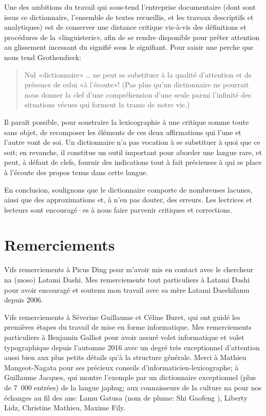Une des ambitions du travail qui sous-tend l'entreprise documentaire (dont sont issus ce dictionnaire, l'ensemble de textes recueillis, et les travaux descriptifs et analytiques) est de conserver une distance critique vis-à-vis des définitions et procédures de la «linguisterie», afin de se rendre disponible pour prêter attention au glissement incessant du signifié sous le signifiant. Pour saisir une perche que nous tend Grothendieck:

\begin{quotation}
    Nul «dictionnaire» {\dots} ne peut se substituer à la qualité d'attention et de présence de celui «à l'écoute»! (Pas plus qu'un dictionnaire ne pourrait nous donner la clef d'une compréhension d'une seule parmi l'infinité des situations vécues qui forment la trame de notre vie.) \cite[1257]{grothendieck_recoltes_2021}
\end{quotation}

Il paraît possible, pour soustraire la lexicographie à une critique somme toute sans objet, de recomposer les éléments de ces deux affirmations qui l'une et l'autre vont de soi. Un dictionnaire n'a pas vocation à se substituer à quoi que ce soit; en revanche, il constitue un outil important pour aborder une langue rare, et peut, à défaut de clefs, fournir des indications tout à fait précieuses à qui se place à l'écoute des propos tenus dans cette langue.

En conclusion, soulignons que le dictionnaire comporte de nombreuses lacunes, ainsi que des approximations et, à n'en pas douter, des erreurs. Les lectrices et lecteurs sont encouragé·es à nous faire parvenir critiques et corrections.


\section{Remerciements}

Vifs remerciements à Picus Ding pour m’avoir mis en contact avec le chercheur na (moso) Latami Dashi. Mes remerciements tout particuliers à Latami Dashi  pour avoir encouragé et soutenu mon travail avec sa mère Latami Daeshilamu  depuis 2006.

Vifs remerciements à Séverine Guillaume et Céline Buret, qui ont guidé les premières étapes du travail de mise en forme informatique. Mes remerciements particuliers à Benjamin Galliot pour avoir assuré volet informatique et volet typographique depuis l'automne 2016 avec un degré très exceptionnel d'attention aussi bien aux plus petits détails qu'à la structure générale. Merci à Mathieu Mangeot-Nagata pour ses précieux conseils d’informaticien-lexicographe; à Guillaume Jacques, qui montre l’exemple par un dictionnaire exceptionnel (plus de 7~000 entrées) de la langue japhug; aux connaisseurs de la culture na pour nos échanges au fil des ans: Lamu Gatusa  (nom de plume: Shi Gaofeng ), Liberty Lidz, Christine Mathieu, Maxime Fily.

